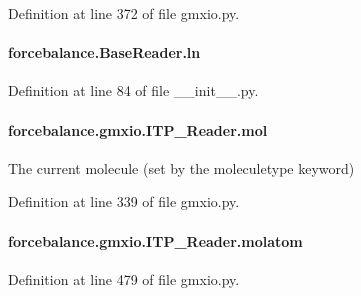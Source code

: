 Definition at line 372 of file gmxio.\-py.

\hypertarget{classforcebalance_1_1BaseReader_a80c8e3bea212600742968aa8669e557b}{
\paragraph[{ln}]{\setlength{\rightskip}{0pt plus 5cm}forcebalance.\-Base\-Reader.\-ln\hspace{0.3cm}{\ttfamily [inherited]}}}\label{classforcebalance_1_1BaseReader_a80c8e3bea212600742968aa8669e557b}


Definition at line 84 of file \-\_\-\-\_\-init\-\_\-\-\_\-.\-py.

\hypertarget{classforcebalance_1_1gmxio_1_1ITP__Reader_a8d70d960437fa51e58954d908fdd297d}{
\paragraph[{mol}]{\setlength{\rightskip}{0pt plus 5cm}forcebalance.\-gmxio.\-I\-T\-P\-\_\-\-Reader.\-mol}}\label{classforcebalance_1_1gmxio_1_1ITP__Reader_a8d70d960437fa51e58954d908fdd297d}


The current molecule (set by the moleculetype keyword) 



Definition at line 339 of file gmxio.\-py.

\hypertarget{classforcebalance_1_1gmxio_1_1ITP__Reader_ad22477e12597eceeceedeb327d723094}{
\paragraph[{molatom}]{\setlength{\rightskip}{0pt plus 5cm}forcebalance.\-gmxio.\-I\-T\-P\-\_\-\-Reader.\-molatom}}\label{classforcebalance_1_1gmxio_1_1ITP__Reader_ad22477e12597eceeceedeb327d723094}


Definition at line 479 of file gmxio.\-py.

